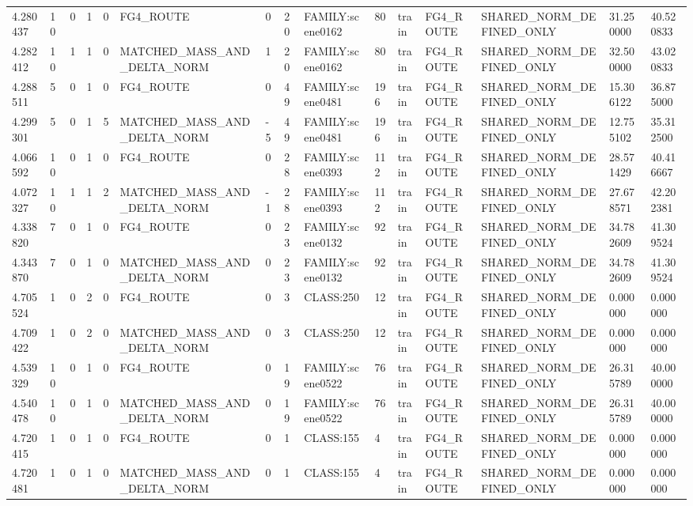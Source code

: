 \begin{tabular}{lllllllllllllll}
4.280437 & 10 & 0 & 1 & 0 & FG4\_ROUTE & 0 & 20 & FAMILY:scene0162 & 80 & train & FG4\_ROUTE & SHARED\_NORM\_DEFINED\_ONLY & 31.250000 & 40.520833 \\
4.282412 & 10 & 1 & 1 & 0 & MATCHED\_MASS\_AND\_DELTA\_NORM & 1 & 20 & FAMILY:scene0162 & 80 & train & FG4\_ROUTE & SHARED\_NORM\_DEFINED\_ONLY & 32.500000 & 43.020833 \\
4.288511 & 5 & 0 & 1 & 0 & FG4\_ROUTE & 0 & 49 & FAMILY:scene0481 & 196 & train & FG4\_ROUTE & SHARED\_NORM\_DEFINED\_ONLY & 15.306122 & 36.875000 \\
4.299301 & 5 & 0 & 1 & 5 & MATCHED\_MASS\_AND\_DELTA\_NORM & -5 & 49 & FAMILY:scene0481 & 196 & train & FG4\_ROUTE & SHARED\_NORM\_DEFINED\_ONLY & 12.755102 & 35.312500 \\
4.066592 & 10 & 0 & 1 & 0 & FG4\_ROUTE & 0 & 28 & FAMILY:scene0393 & 112 & train & FG4\_ROUTE & SHARED\_NORM\_DEFINED\_ONLY & 28.571429 & 40.416667 \\
4.072327 & 10 & 1 & 1 & 2 & MATCHED\_MASS\_AND\_DELTA\_NORM & -1 & 28 & FAMILY:scene0393 & 112 & train & FG4\_ROUTE & SHARED\_NORM\_DEFINED\_ONLY & 27.678571 & 42.202381 \\
4.338820 & 7 & 0 & 1 & 0 & FG4\_ROUTE & 0 & 23 & FAMILY:scene0132 & 92 & train & FG4\_ROUTE & SHARED\_NORM\_DEFINED\_ONLY & 34.782609 & 41.309524 \\
4.343870 & 7 & 0 & 1 & 0 & MATCHED\_MASS\_AND\_DELTA\_NORM & 0 & 23 & FAMILY:scene0132 & 92 & train & FG4\_ROUTE & SHARED\_NORM\_DEFINED\_ONLY & 34.782609 & 41.309524 \\
4.705524 & 1 & 0 & 2 & 0 & FG4\_ROUTE & 0 & 3 & CLASS:250 & 12 & train & FG4\_ROUTE & SHARED\_NORM\_DEFINED\_ONLY & 0.000000 & 0.000000 \\
4.709422 & 1 & 0 & 2 & 0 & MATCHED\_MASS\_AND\_DELTA\_NORM & 0 & 3 & CLASS:250 & 12 & train & FG4\_ROUTE & SHARED\_NORM\_DEFINED\_ONLY & 0.000000 & 0.000000 \\
4.539329 & 10 & 0 & 1 & 0 & FG4\_ROUTE & 0 & 19 & FAMILY:scene0522 & 76 & train & FG4\_ROUTE & SHARED\_NORM\_DEFINED\_ONLY & 26.315789 & 40.000000 \\
4.540478 & 10 & 0 & 1 & 0 & MATCHED\_MASS\_AND\_DELTA\_NORM & 0 & 19 & FAMILY:scene0522 & 76 & train & FG4\_ROUTE & SHARED\_NORM\_DEFINED\_ONLY & 26.315789 & 40.000000 \\
4.720415 & 1 & 0 & 1 & 0 & FG4\_ROUTE & 0 & 1 & CLASS:155 & 4 & train & FG4\_ROUTE & SHARED\_NORM\_DEFINED\_ONLY & 0.000000 & 0.000000 \\
4.720481 & 1 & 0 & 1 & 0 & MATCHED\_MASS\_AND\_DELTA\_NORM & 0 & 1 & CLASS:155 & 4 & train & FG4\_ROUTE & SHARED\_NORM\_DEFINED\_ONLY & 0.000000 & 0.000000 \\

\end{tabular}
